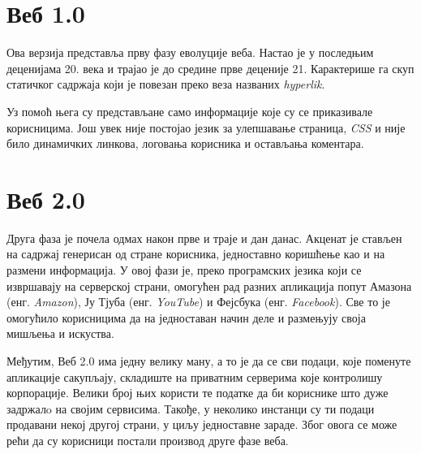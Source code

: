 \documentclass[12pt,oneside]{memoir}
\begin{document}
\section{Веб 1.0}
\label{sec:sem_veb_veb_1}

Ова верзија представља прву фазу еволуције веба. Настао је у последњим деценијама 20. века и трајао је до средине прве деценије 21. Карактерише га скуп статичког садржаја који је повезан преко веза названих \textit{hyperlik}.

Уз помоћ њега су представљане само информације које су се приказивале корисницима. Још увек није постојао језик за улепшавање страница, \textit{CSS} и није било динамичких линкова, логовања корисника и остављања коментара.



\section{Веб 2.0}
\label{sec:sem_veb_veb_2}

Друга фаза је почела одмах након прве и траје и дан данас. Акценат је стављен на садржај генерисан од стране корисника, једноставно коришћење као и на размени информација. У овој фази је, преко програмских језика који се извршавају на серверској страни, омогућен рад разних апликација попут Амазона (енг. \textit{Amazon}), Ју Тјуба (енг. \textit{YouTube}) и Фејсбука (енг. \textit{Facebook}). Све то је омогућило корисницима да на једноставан начин деле и размењују своја мишљења и искуства.


Међутим, Веб 2.0 има једну велику ману, а то је да се сви подаци, које поменуте апликације сакупљају, складиште на приватним серверима које контролишу корпорације. Велики број њих користи те податке да би кориснике што дуже задржалo на својим сервисима. Такође, у неколико инстанци су ти подаци продавани некој другој страни, у циљу једноставне зараде. Због овога се може рећи да су корисници постали производ друге фазе веба.
\end{document}
